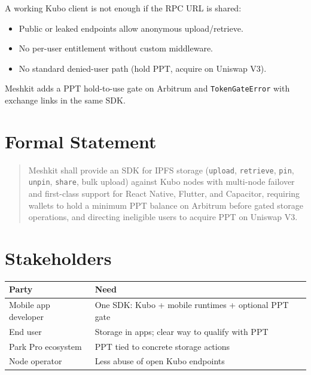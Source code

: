 \documentclass[11pt,a4paper,openany]{report}
\begin{document}
A working Kubo client is not enough if the RPC URL is shared:

\begin{itemize}[leftmargin=*]
  \item Public or leaked endpoints allow anonymous upload/retrieve.
  \item No per-user entitlement without custom middleware.
  \item No standard denied-user path (hold PPT, acquire on Uniswap V3).
\end{itemize}

Meshkit adds a PPT hold-to-use gate on Arbitrum and \texttt{TokenGateError} with exchange links in the same SDK.

\section{Formal Statement}

\begin{quote}
Meshkit shall provide an SDK for IPFS storage (\texttt{upload}, \texttt{retrieve}, \texttt{pin}, \texttt{unpin}, \texttt{share}, bulk upload) against Kubo nodes with multi-node failover and first-class support for React Native, Flutter, and Capacitor, requiring wallets to hold a minimum PPT balance on Arbitrum before gated storage operations, and directing ineligible users to acquire PPT on Uniswap V3.
\end{quote}

\section{Stakeholders}

\begin{center}
\begin{tabular}{@{}p{3.2cm}p{9.8cm}@{}}
\toprule
\textbf{Party} & \textbf{Need} \\
\midrule
Mobile app developer & One SDK: Kubo + mobile runtimes + optional PPT gate \\
End user & Storage in apps; clear way to qualify with PPT \\
Park Pro ecosystem & PPT tied to concrete storage actions \\
Node operator & Less abuse of open Kubo endpoints \\
\bottomrule
\end{tabular}
\end{center}

\end{document}
